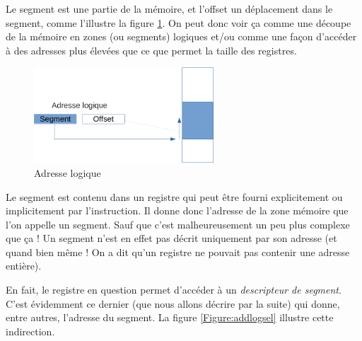   Le segment est une partie de la mémoire, et l'offset un déplacement
dans le segment, comme l'illustre la figure \ref{Fig-1}. On
peut donc voir ça comme une découpe de la mémoire 
en zones (ou segments) logiques et/ou comme une façon d'accéder à des
adresses plus élevées que ce que permet la taille des registres.


\begin{figure}[htbp]
\begin{center}
\includegraphics[width=0.6\textwidth]{adresse-logique.png}
\caption{\label{Fig-1}Adresse logique}
\end{center}
\end{figure} 

   Le segment est contenu dans un registre qui peut être fourni
explicitement ou implicitement par l'instruction. Il donne donc
l'adresse de la zone mémoire que l'on appelle un segment. Sauf que
c'est malheureusement un peu plus complexe que ça ! Un segment n'est
en effet pas décrit uniquement par son adresse (et quand bien même !
On a dit qu'un registre ne pouvait pas contenir une adresse entière).

   En fait, le registre en question permet d'accéder à un {\em
descripteur de segment}. C'est évidemment ce dernier (que nous
allons décrire par la suite) qui donne, entre autres, l'adresse du
segment. La figure \ref{Figure:addlogsel} illustre cette indirection.


